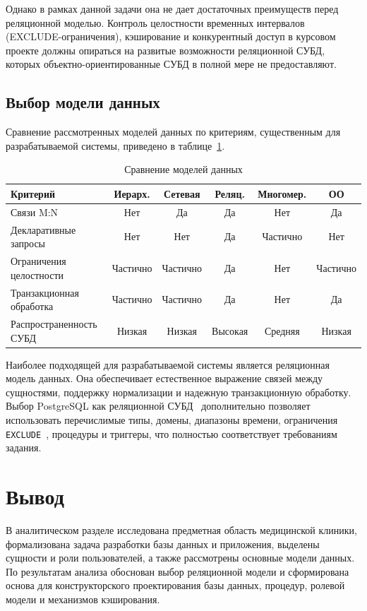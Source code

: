 Однако в рамках данной задачи она не дает достаточных преимуществ перед реляционной моделью. Контроль целостности временных интервалов (EXCLUDE-ограничения), кэширование и конкурентный доступ в курсовом проекте должны опираться на развитые возможности реляционной СУБД, которых объектно-ориентированные СУБД в полной мере не предоставляют.

\subsection{Выбор модели данных}

Сравнение рассмотренных моделей данных по критериям, существенным для разрабатываемой системы, приведено в таблице~\ref{tab:model-comparison}.

\begin{table}[ht]
    \centering
    \caption{Сравнение моделей данных}
    \label{tab:model-comparison}
    \small
    \begin{tabular}{|p{4.0cm}|c|c|c|c|c|}
        \hline
        Критерий & Иерарх. & Сетевая & Реляц. & Многомер. & ОО \\
        \hline
        Связи M:N & Нет & Да & Да & Нет & Да \\
        \hline
        Декларативные запросы & Нет & Нет & Да & Частично & Нет \\
        \hline
        Ограничения целостности & Частично & Частично & Да & Нет & Частично \\
        \hline
        Транзакционная обработка & Частично & Частично & Да & Нет & Да \\
        \hline
        Распространенность СУБД & Низкая & Низкая & Высокая & Средняя & Низкая \\
        \hline
    \end{tabular}
    \normalsize
\end{table}

Наиболее подходящей для разрабатываемой системы является реляционная модель данных. Она обеспечивает естественное выражение связей между сущностями, поддержку нормализации и надежную транзакционную обработку. Выбор PostgreSQL как реляционной СУБД~\cite{postgres_main} дополнительно позволяет использовать перечислимые типы, домены, диапазоны времени, ограничения \texttt{EXCLUDE}~\cite{postgres_constraints}, процедуры и триггеры, что полностью соответствует требованиям задания.

\section{Вывод}

В аналитическом разделе исследована предметная область медицинской клиники, формализована задача разработки базы данных и приложения, выделены сущности и роли пользователей, а также рассмотрены основные модели данных. По результатам анализа обоснован выбор реляционной модели и сформирована основа для конструкторского проектирования базы данных, процедур, ролевой модели и механизмов кэширования.

\clearpage
